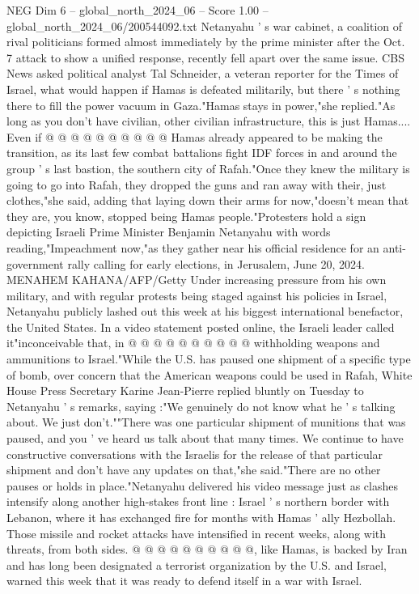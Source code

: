 \begin{textsample}{NEG Dim 6 – global\_north\_2024\_06 – Score 1.00 – global\_north\_2024\_06/200544092.txt}
Netanyahu ' s war cabinet, a coalition of rival politicians formed almost immediately by the prime minister after the Oct. 7 attack to show a unified response, recently fell apart over the same issue.
CBS News asked political analyst Tal Schneider, a veteran reporter for the Times of Israel, what would happen if Hamas is defeated militarily, but there ' s nothing there to fill the power vacuum in Gaza."Hamas stays in power,"she replied."As long as you don't have civilian, other civilian infrastructure, this is just Hamas....
Even if @ @ @ @ @ @ @ @ @ @ Hamas already appeared to be making the transition, as its last few combat battalions fight IDF forces in and around the group ' s last bastion, the southern city of Rafah."Once they knew the military is going to go into Rafah, they dropped the guns and ran away with their, just clothes,"she said, adding that laying down their arms for now,"doesn't mean that they are, you know, stopped being Hamas people."Protesters hold a sign depicting Israeli Prime Minister Benjamin Netanyahu with words reading,"Impeachment now,"as they gather near his official residence for an anti-government rally calling for early elections, in Jerusalem, June 20, 2024.
MENAHEM KAHANA/AFP/Getty Under increasing pressure from his own military, and with regular protests being staged against his policies in Israel, Netanyahu publicly lashed out this week at his biggest international benefactor, the United States.
In a video statement posted online, the Israeli leader called it"inconceivable that, in @ @ @ @ @ @ @ @ @ @ withholding weapons and ammunitions to Israel."While the U.S. has paused one shipment of a specific type of bomb, over concern that the American weapons could be used in Rafah, White House Press Secretary Karine Jean-Pierre replied bluntly on Tuesday to Netanyahu ' s remarks, saying :"We genuinely do not know what he ' s talking about.
We just don't.""There was one particular shipment of munitions that was paused, and you ' ve heard us talk about that many times.
We continue to have constructive conversations with the Israelis for the release of that particular shipment and don't have any updates on that,"she said."There are no other pauses or holds in place."Netanyahu delivered his video message just as clashes intensify along another high-stakes front line : Israel ' s northern border with Lebanon, where it has exchanged fire for months with Hamas ' ally Hezbollah.
Those missile and rocket attacks have intensified in recent weeks, along with threats, from both sides. @ @ @ @ @ @ @ @ @ @, like Hamas, is backed by Iran and has long been designated a terrorist organization by the U.S. and Israel, warned this week that it was ready to defend itself in a war with Israel.

\end{textsample}

